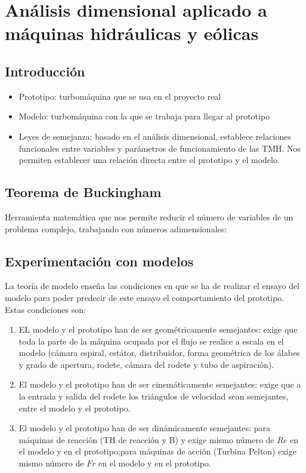 \chapter{Análisis dimensional aplicado a máquinas hidráulicas y eólicas}

\section{Introducción}
\begin{itemize}
    \item Prototipo: turbomáquina que se usa en el proyecto real
    \item Modelo: turbomáquina con la que se trabaja para llegar al prototipo
    \item Leyes de semejanza: basado en el análisis dimensional, establece relaciones funcionales entre variables y parámetros de funcionamiento de las TMH. Nos permiten establecer una relación directa entre el prototipo y el modelo.
\end{itemize}

\section{Teorema de Buckingham}
Herramienta matemática que nos permite reducir el número de variables de un problema complejo, trabajando con números adimensionales:


\section{Experimentación con modelos}
La teoría de modelo enseña las condiciones en que se ha de realizar el ensayo del modelo para poder predecir de este ensayo el comportamiento del prototipo. Estas condiciones son:
\begin{enumerate}
    \item EL modelo y el prototipo han de ser geométricamente semejantes: exige que toda la parte de la máquina ocupada por el flujo se realice a escala en el modelo (cámara espiral, estátor, distribuidor, forma geométrica de los álabes y grado de apertura, rodete, cámara del rodete y tubo de aspiración).
    \item El modelo y el prototipo han de ser cinemáticamente semejantes: exige que a la entrada y salida del rodete los triángulos de velocidad sean semejantes, entre el modelo y el prototipo.
    \item El modelo y el prototipo han de ser dinámicamente semejantes: para máquinas de reacción (TH de reacción y B) y exige mismo número de $Re$ en el modelo y en el prototipo;para máquinas de acción (Turbina Pelton) exige mismo número de $Fr$ en el modelo y en el prototipo.
\end{enumerate}


